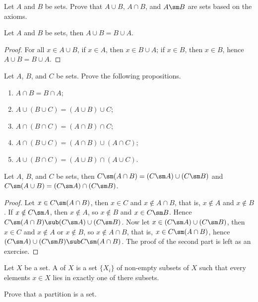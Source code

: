 \documentclass[10pt]{article}
\begin{document}
\begin{problem}
    Let $A$ and $B$ be sets. Prove that $A\cup B$, $A\cap B$, and $A\sm B$ are sets based on the axioms.
\end{problem}
\begin{proposition}
    Let $A$ and $B$ be sets, then $A\cup B=B\cup A$.
\end{proposition}
\begin{proof}
    For all $x\in A\cup B$, if $x\in A$, then $x\in B\cup A$; if $x\in B$, then $x\in B$, hence $A\cup B=B\cup A$.
\end{proof}
\begin{problem}
    Let $A$, $B$, and $C$ be sets. Prove the following propositions.
    \begin{enumerate}
        \item $A\cap B=B\cap A$;
        \item $A\cup(B\cup C)=(A\cup B)\cup C$;
        \item $A\cap(B\cap C)=(A\cap B)\cap C$;
        \item $A\cap(B\cup C)=(A\cap B)\cup(A\cap C)$;
        \item $A\cup(B\cap C)=(A\cup B)\cap(A\cup C)$.
    \end{enumerate}
\end{problem}
\begin{theorem}
    Let $A$, $B$, and $C$ be sets, then $C\sm(A\cap B)=(C\sm A)\cup(C\sm B)$ and $C\sm(A\cup B)=(C\sm A)\cap(C\sm B)$.
\end{theorem}
\begin{proof}
    Let $x\in C\sm(A\cap B)$, then $x\in C$ and $x\notin A\cap B$, that is, $x\notin A$ and $x\notin B$. If $x\notin C\sm A$, then $x\notin A$, so $x\notin B$ and $x\in C\sm B$. Hence $C\sm(A\cap B)\sub(C\sm A)\cup(C\sm B)$. Now let $x\in(C\sm A)\cup(C\sm B)$, then $x\in C$ and $x\notin A$ or $x\notin B$, so $x\notin A\cap B$, that is, $x\in C\sm(A\cap B)$, hence $(C\sm A)\cup(C\sm B)\sub C\sm(A\cap B)$. The proof of the second part is left as an exercise.
\end{proof}
\begin{definition}
    Let $X$ be a set. A  of $X$ is a set $\{{X}_{i}\}$ of non-empty subsets of $X$ such that every elements $x\in X$ lies in exactly one of there subsets.
\end{definition}
\begin{problem}
    Prove that a partition is a set.
\end{problem}
\end{document}
